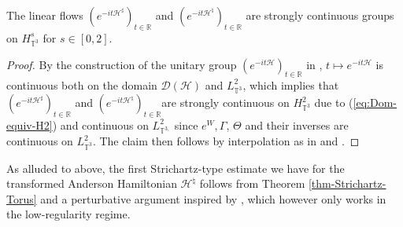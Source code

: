 \begin{lem}
  \label{lem:cont-e-itHsharp}The linear flows $(e^{- i t
  \mathcal{H}^{\sharp}})_{t \in \mathbb{R}}$ and $(e^{- i t
  \mathcal{H}^{\natural}})_{t \in \mathbb{R}}$ are strongly continuous groups
  on $H_{\mathbb{T}^3}^s$ for $s \in [0, 2] .$
\end{lem}

\begin{proof}
  By the construction of the unitary group $(e^{- i t \mathcal{H}})_{t \in
  \mathbb{R}}$ in {\cite{GUZ20}}, $t \mapsto e^{- i t \mathcal{H}}$ is
  continuous both on the domain $\mathcal{D} (\mathcal{H})$ and
  $L_{\mathbb{T}^3}^2$, which implies that $(e^{- i t
  \mathcal{H}^{\sharp}})_{t \in \mathbb{R}}$ and $(e^{- i t
  \mathcal{H}^{\natural}})_{t \in \mathbb{R}} $are strongly continuous on
  $H_{\mathbb{T}^3}^2$ due to (\ref{eq:Dom-equiv-H2}) and continuous on
  $L_{\mathbb{T}^{3,}}^2$ since $e^W, \Gamma$, $\Theta$ and their inverses are
  continuous on $L_{\mathbb{T}^3}^2$. The claim then follows by interpolation
  as in {\cite{Z19}} and {\cite{MZ24}}.
\end{proof}

As alluded to above, the first Strichartz-type estimate we have for the
transformed Anderson Hamiltonian $\mathcal{H}^{\natural}$ follows from Theorem
\ref{thm-Strichartz-Torus} and a perturbative argument inspired by
{\cite{BGT04}}, which however only works in the low-regularity
regime.

